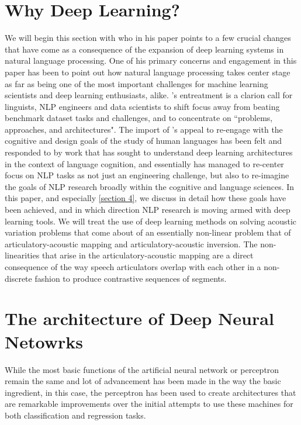 \documentclass{article}[12pt]
\newcommand{\possessivecite}[1]{\citeauthor{#1}'s \citeyear{#1}}
\begin{document}
\section{Why Deep Learning?}
We will begin this section with \cite{manning2015} who in his paper points to a few crucial changes that have come as a consequence of the expansion of deep learning systems in natural language processing. One of his primary concerns and engagement in this paper has been to point out how natural language processing takes center stage as far as being one of the most important challenges for machine learning scientists and deep learning enthusiasts, alike. \possessivecite{manning2015} entreatment is a clarion call for linguists, NLP engineers and data scientists to shift focus away from beating benchmark dataset tasks and challenges, and to concentrate on ``problems, approaches, and architectures". The import of \possessivecite{manning2015} appeal to re-engage with the cognitive and design goals of the study of human languages has been felt and responded to by work that has sought to understand deep learning architectures in the context of language cognition, and essentially has managed to re-center focus on NLP tasks as not just an engineering challenge, but also to re-imagine the goals of NLP research broadly within the cognitive and language sciences. In this paper, and especially \ref{section 4}, we discuss in detail how these goals have been achieved, and in which direction NLP research is moving armed with deep learning tools. We will treat the use of deep learning methods on solving acoustic variation problems that come about of an essentially non-linear problem that of articulatory-acoustic mapping and articulatory-acoustic inversion. The non-linearities that arise in the articulatory-acoustic mapping are a direct consequence of the way speech articulators overlap with each other in a non-discrete fashion to produce contrastive sequences of segments.

\section{The architecture of Deep Neural Netowrks}
While the most basic functions of the artificial neural network or perceptron remain the same and lot of advancement has been made in the way the basic ingredient, in this case, the perceptron has been used to create architectures that are remarkable improvements over the initial attempts to use these machines for both classification and regression tasks.
\end{document}
